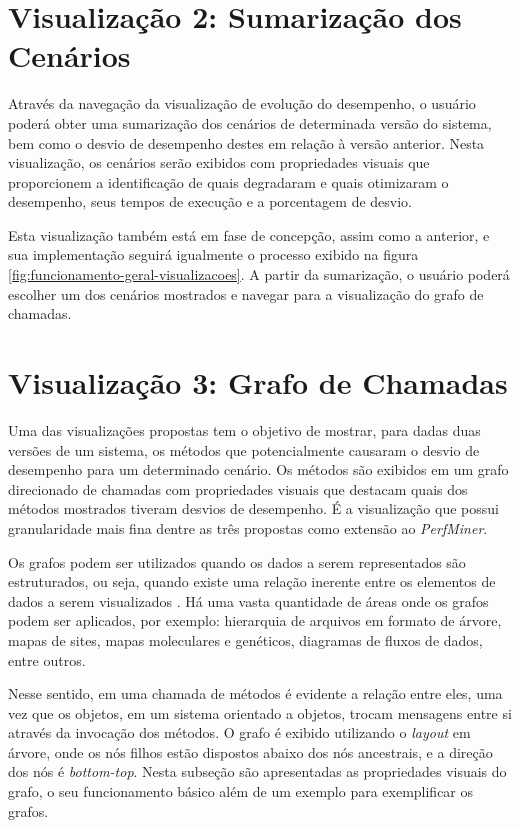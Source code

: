 \section{Visualização 2: Sumarização dos Cenários} \label{sec:visualizacao2}

Através da navegação da visualização de evolução do desempenho, o usuário poderá obter uma sumarização dos cenários de determinada versão do sistema, bem como o desvio de desempenho destes em relação à versão anterior. Nesta visualização, os cenários serão exibidos com propriedades visuais que proporcionem a identificação de quais degradaram e quais otimizaram o desempenho, seus tempos de execução e a porcentagem de desvio.

Esta visualização também está em fase de concepção, assim como a anterior, e sua implementação seguirá igualmente o processo exibido na figura \ref{fig:funcionamento-geral-visualizacoes}. A partir da sumarização, o usuário poderá escolher um dos cenários mostrados e navegar para a visualização do grafo de chamadas.

\section{Visualização 3: Grafo de Chamadas} \label{sec:visualizacao3}

Uma das visualizações propostas tem o objetivo de mostrar, para dadas duas versões de um sistema, os métodos que potencialmente causaram o desvio de desempenho para um determinado cenário. Os métodos são exibidos em um grafo direcionado de chamadas com propriedades visuais que destacam quais dos métodos mostrados tiveram desvios de desempenho. É a visualização que possui granularidade mais fina dentre as três propostas como extensão ao \textit{PerfMiner}.

Os grafos podem ser utilizados quando os dados a serem representados são estruturados, ou seja, quando existe uma relação inerente entre os elementos de dados a serem visualizados \cite{Herman2000}. Há uma vasta quantidade de áreas onde os grafos podem ser aplicados, por exemplo: hierarquia de arquivos em formato de árvore, mapas de sites, mapas moleculares e genéticos, diagramas de fluxos de dados, entre outros.

Nesse sentido, em uma chamada de métodos é evidente a relação entre eles, uma vez que os objetos, em um sistema orientado a objetos, trocam mensagens entre si através da invocação dos métodos. O grafo é exibido utilizando o \textit{layout} em árvore, onde os nós filhos estão dispostos abaixo dos nós ancestrais, e a direção dos nós é \textit{bottom-top}. Nesta subseção são apresentadas as propriedades visuais do grafo, o seu funcionamento básico além de um exemplo para exemplificar os grafos.

